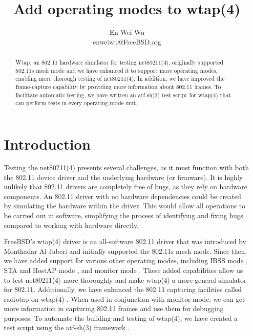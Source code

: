 \documentclass[conference]{IEEEtran}
\begin{document}
\title{Add operating modes to wtap(4)}
\author{
\rm En-Wei Wu \\
\rm enweiwu@FreeBSD.org \\
}

\author{
}

\maketitle

\begin{abstract}
Wtap, an 802.11 hardware simulator for testing net80211(4), originally supported 802.11s mesh mode and we have enhanced it to support more operating modes, enabling more thorough testing of net80211(4). In addition, we have improved the frame-capture capability by providing more information about 802.11 frames. To facilitate automatic testing, we have written an atf-sh(3) test script for wtap(4) that can perform tests in every operating mode unit.
\end{abstract}

\section{Introduction}
Testing the net80211(4) presents several challenges, as it must function with both the 802.11 device driver and the underlying hardware (or firmware). It is highly unlikely that 802.11 drivers are completely free of bugs, as they rely on hardware components. An 802.11 driver with no hardware dependencies could be created by simulating the hardware within the driver. This would allow all operations to be carried out in software, simplifying the process of identifying and fixing bugs compared to working with hardware directly.

FreeBSD's wtap(4) driver is an all-software 802.11 driver that was introduced by Monthadar Al Jaberi \cite{commit:wtap_origin} and initially supported the 802.11s mesh mode. Since then, we have added support for various other operating modes, including IBSS mode \cite{commit:adhoc}, STA and HostAP mode \cite{commit:hostap}, and monitor mode \cite{commit:monitor}. These added capabilities allow us to test net80211(4) more thoroughly and make wtap(4) a more general simulator for 802.11. Additionally, we have enhanced the 802.11 capturing facilities called radiotap on wtap(4) \cite{commit:monitor}. When used in conjunction with monitor mode, we can get more information in capturing 802.11 frames and use them for debugging purposes. To automate the building and testing of wtap(4), we have created a test script using the atf-sh(3) framework \cite{commit:atf}.
\end{document}
